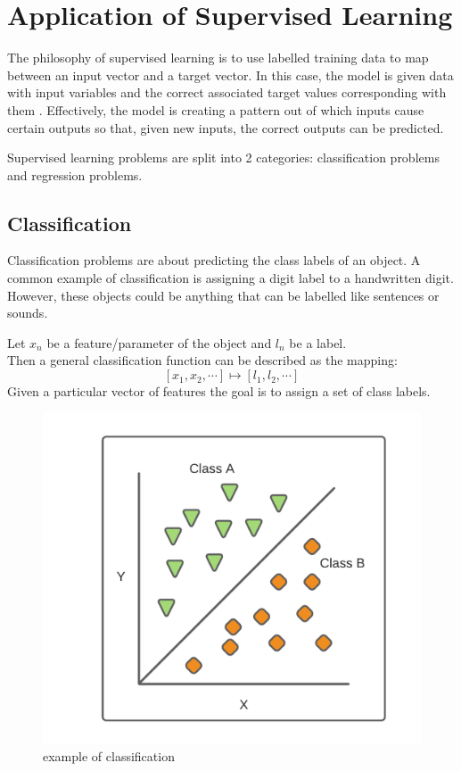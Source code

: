 \documentclass[10pt,a4paper]{report}
\begin{document}
		\section{Application of Supervised Learning}
			The philosophy of supervised learning is to use labelled training data to map between
			an input vector and a target vector. In this case, the model is given
			data with input variables and the correct associated target values corresponding with them \autocite[p. 105]{DeepLearning}.
			Effectively, the model is creating a pattern out of which inputs cause certain outputs so that,
			given new inputs, the correct outputs can be predicted. \par
			Supervised learning problems are split into 2 categories: classification problems and regression problems.

			\subsection{Classification}
				Classification problems are about predicting the class labels of an object. A common example
				of classification is assigning a digit label to a handwritten digit. However, these objects
				could be anything that can be labelled like sentences or sounds. \par
				Let $x_n$ be a feature/parameter of the object and $l_n$ be a label.\\
				Then a general classification function can be described as the mapping: \[[x_1,x_2,\cdots] \mapsto [l_1,l_2,\cdots]\]
				Given a particular vector of features the goal is to assign a set of class labels.
				\begin{figure}[h]
					\centering
					\includegraphics[scale=0.7]{classification-diagram.png}
					\caption{example of classification}
					\label{fig:classifcation}
				\end{figure}
\end{document}

